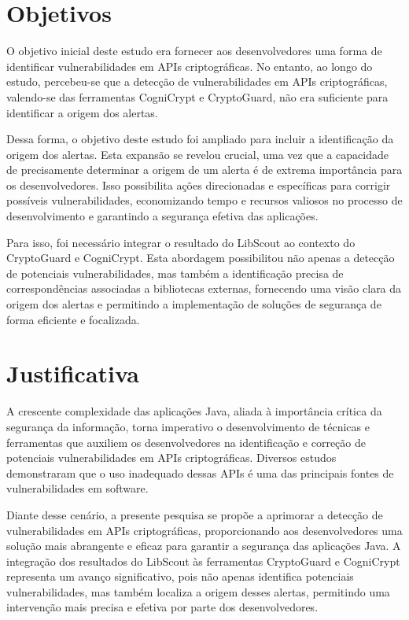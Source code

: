 \section{Objetivos}

O objetivo inicial deste estudo era fornecer aos desenvolvedores uma forma de identificar vulnerabilidades em APIs criptográficas. No entanto, ao longo do estudo, percebeu-se que a detecção de vulnerabilidades em APIs criptográficas, valendo-se das ferramentas CogniCrypt e CryptoGuard, não era suficiente para identificar a origem dos alertas.

Dessa forma, o objetivo deste estudo foi ampliado para incluir a identificação da origem dos alertas. Esta expansão se revelou crucial, uma vez que a capacidade de precisamente determinar a origem de um alerta é de extrema importância para os desenvolvedores. Isso possibilita ações direcionadas e específicas para corrigir possíveis vulnerabilidades, economizando tempo e recursos valiosos no processo de desenvolvimento e garantindo a segurança efetiva das aplicações.

Para isso, foi necessário integrar o resultado do LibScout ao contexto do CryptoGuard e CogniCrypt. Esta abordagem possibilitou não apenas a detecção de potenciais vulnerabilidades, mas também a identificação precisa de correspondências associadas a bibliotecas externas, fornecendo uma visão clara da origem dos alertas e permitindo a implementação de soluções de segurança de forma eficiente e focalizada.

\section{Justificativa}

A crescente complexidade das aplicações Java, aliada à importância crítica da segurança da informação, torna imperativo o desenvolvimento de técnicas e ferramentas que auxiliem os desenvolvedores na identificação e correção de potenciais vulnerabilidades em APIs criptográficas. Diversos estudos demonstraram que o uso inadequado dessas APIs é uma das principais fontes de vulnerabilidades em software. 

Diante desse cenário, a presente pesquisa se propõe a aprimorar a detecção de vulnerabilidades em APIs criptográficas, proporcionando aos desenvolvedores uma solução mais abrangente e eficaz para garantir a segurança das aplicações Java. A integração dos resultados do LibScout às ferramentas CryptoGuard e CogniCrypt representa um avanço significativo, pois não apenas identifica potenciais vulnerabilidades, mas também localiza a origem desses alertas, permitindo uma intervenção mais precisa e efetiva por parte dos desenvolvedores. 

